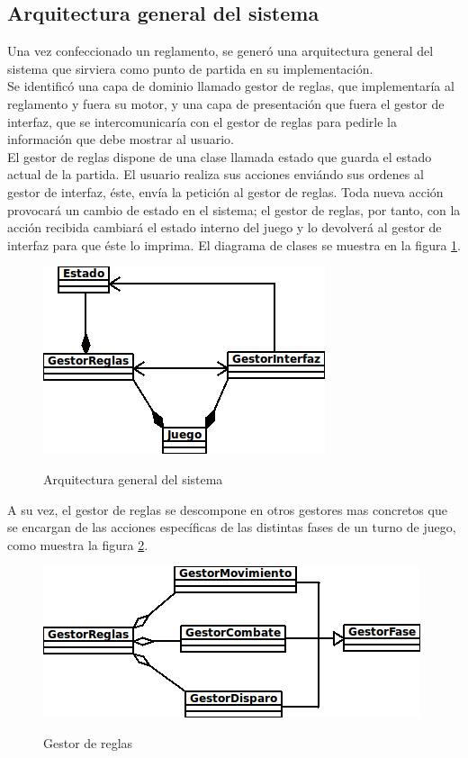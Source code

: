 \documentclass[a4paper,11pt]{article} %
\begin{document}
\subsection{Arquitectura general del sistema}
\label{sec:arq}
\noindent
Una vez confeccionado un reglamento, se generó una arquitectura
general del sistema que sirviera como punto de partida en su
implementación.\\

\noindent
Se identificó una capa de dominio llamado gestor de reglas, que
implementaría al reglamento y fuera su motor, y una capa de
presentación que fuera el gestor de interfaz, que se intercomunicaría
con el gestor de reglas para pedirle la información que debe mostrar
al usuario.\\

\noindent
El gestor de reglas dispone de una clase llamada estado que guarda el
estado actual de la partida. El usuario realiza sus acciones enviándo
sus ordenes al gestor de interfaz, éste, envía la petición al gestor
de reglas. Toda nueva acción provocará un cambio de estado en el
sistema; el gestor de reglas, por tanto, con la acción recibida
cambiará el estado interno del juego y lo devolverá al gestor de
interfaz para que éste lo imprima. El diagrama de clases se muestra en
la figura \ref{fig:arqgen}.

\begin{figure}[h]
\centering
\includegraphics[scale=.8]{./imagenes/DiagramaJuego.png}
\label{fig:arqgen}
\caption{Arquitectura general del sistema}
\end{figure}

\noindent
A su vez, el gestor de reglas se descompone en otros gestores mas
concretos que se encargan de las acciones específicas de las distintas
fases de un turno de juego, como muestra la figura \ref{fig:reglas}.

\begin{figure}[h]
\centering
\includegraphics[scale=.8]{./imagenes/Reglas.png}
\label{fig:reglas}
\caption{Gestor de reglas}
\end{figure}
\end{document}
